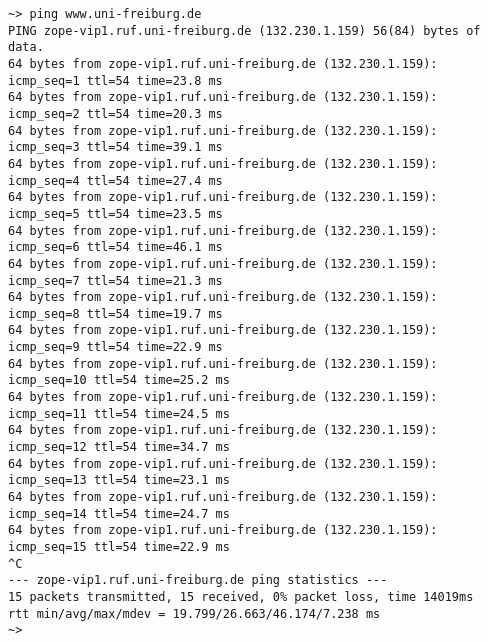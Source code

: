 \documentclass{scrartcl}
\begin{document}
\begin{verbatim}
~> ping www.uni-freiburg.de
PING zope-vip1.ruf.uni-freiburg.de (132.230.1.159) 56(84) bytes of data.
64 bytes from zope-vip1.ruf.uni-freiburg.de (132.230.1.159): icmp_seq=1 ttl=54 time=23.8 ms
64 bytes from zope-vip1.ruf.uni-freiburg.de (132.230.1.159): icmp_seq=2 ttl=54 time=20.3 ms
64 bytes from zope-vip1.ruf.uni-freiburg.de (132.230.1.159): icmp_seq=3 ttl=54 time=39.1 ms
64 bytes from zope-vip1.ruf.uni-freiburg.de (132.230.1.159): icmp_seq=4 ttl=54 time=27.4 ms
64 bytes from zope-vip1.ruf.uni-freiburg.de (132.230.1.159): icmp_seq=5 ttl=54 time=23.5 ms
64 bytes from zope-vip1.ruf.uni-freiburg.de (132.230.1.159): icmp_seq=6 ttl=54 time=46.1 ms
64 bytes from zope-vip1.ruf.uni-freiburg.de (132.230.1.159): icmp_seq=7 ttl=54 time=21.3 ms
64 bytes from zope-vip1.ruf.uni-freiburg.de (132.230.1.159): icmp_seq=8 ttl=54 time=19.7 ms
64 bytes from zope-vip1.ruf.uni-freiburg.de (132.230.1.159): icmp_seq=9 ttl=54 time=22.9 ms
64 bytes from zope-vip1.ruf.uni-freiburg.de (132.230.1.159): icmp_seq=10 ttl=54 time=25.2 ms
64 bytes from zope-vip1.ruf.uni-freiburg.de (132.230.1.159): icmp_seq=11 ttl=54 time=24.5 ms
64 bytes from zope-vip1.ruf.uni-freiburg.de (132.230.1.159): icmp_seq=12 ttl=54 time=34.7 ms
64 bytes from zope-vip1.ruf.uni-freiburg.de (132.230.1.159): icmp_seq=13 ttl=54 time=23.1 ms
64 bytes from zope-vip1.ruf.uni-freiburg.de (132.230.1.159): icmp_seq=14 ttl=54 time=24.7 ms
64 bytes from zope-vip1.ruf.uni-freiburg.de (132.230.1.159): icmp_seq=15 ttl=54 time=22.9 ms
^C
--- zope-vip1.ruf.uni-freiburg.de ping statistics ---
15 packets transmitted, 15 received, 0% packet loss, time 14019ms
rtt min/avg/max/mdev = 19.799/26.663/46.174/7.238 ms
~>
\end{verbatim}
\end{document}
